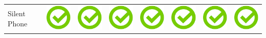 \documentclass[10pt,foldmark,tumble]{leaflet}
\begin{document}
{{\begin{tabular}{ L{2cm} | C{2cm} | C{2cm} | C{2cm} | C{2cm} | C{2cm} | C{2cm} | C{2cm} | }
Silent Phone & \includegraphics[scale=0.1]{pics/haken.png} & \includegraphics[scale=0.1]{pics/haken.png} & \includegraphics[scale=0.1]{pics/haken.png} & \includegraphics[scale=0.1]{pics/haken.png} & \includegraphics[scale=0.1]{pics/haken.png} & \includegraphics[scale=0.1]{pics/haken.png} & \includegraphics[scale=0.1]{pics/haken.png} \tabularnewline

\end{tabular}}}
\end{document}
